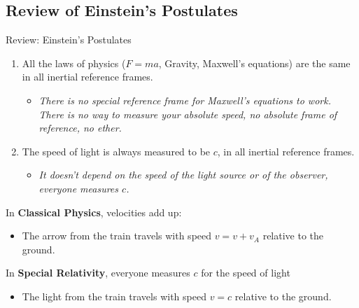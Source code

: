 \documentclass[aspectratio=169,
hyperref={colorlinks,urlcolor=blue}
]{beamer}
\begin{document}
\subsection{Review of Einstein's Postulates}
\label{subsec:reviewofeinsteinspostulates}
\begin{frame}{Review: Einstein's Postulates}
\begin{enumerate}
\item All the laws of physics ($F=ma$, Gravity, Maxwell's equations) are the same in all inertial reference frames.
\begin{itemize}
\item[$\rightarrow$] \emph{There is no special reference frame for Maxwell's equations to work. There is no way to measure your absolute speed, no absolute frame of reference, no ether.}
\end{itemize}
\item The speed of light is always measured to be $c$, in all inertial reference frames.
\begin{itemize}
\item[$\rightarrow$] \emph{It doesn't depend on the speed of the light source or of the observer, everyone measures $c$.}
\end{itemize}
\end{enumerate}
\end{frame}



{
\vspace{-1cm}
In \textbf{Classical Physics}, velocities add up:
\begin{itemize}
\item[$\rightarrow$] The arrow from the train travels with speed $v=v+v_A$ relative to the ground.
\end{itemize}
}
{
\vspace{-1cm}
In \textbf{Special Relativity}, everyone measures $c$ for the speed of light
\begin{itemize}
\item[$\rightarrow$] The light from the train travels with speed $v=c$ relative to the ground.
\end{itemize}
}



\end{document}
